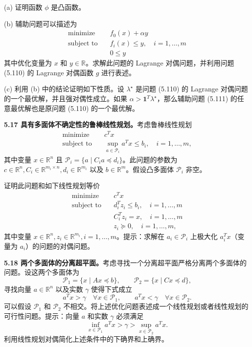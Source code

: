 \documentclass[UTF8,12pt,a4paper,fontset=fandol]{ctexart}
\begin{document}
(a) 证明函数 $\phi$ 是凸函数。

(b) 辅助问题可以描述为
\[
\begin{aligned}
\text{minimize}\quad & f_0(x)+\alpha y\\
\text{subject to}\quad & f_i(x)\leq y,\quad i=1,\ldots,m\\
& 0\leq y
\end{aligned}
\]
其中优化变量为 $x$ 和 $y\in\mathbb{R}$。求解此问题的 Lagrange 对偶问题，并利用问题 (5.110) 的 Lagrange 对偶函数 $g$ 进行表述。

(c) 利用 (b) 中的结论证明如下性质。设 $\lambda^\star$ 是问题 (5.110) 的 Lagrange 对偶问题的一个最优解，并且强对偶性成立。如果 $\alpha>\mathbf{1}^T\lambda^\star$，那么辅助问题 (5.111) 的任意最优解也是原问题 (5.110) 的一个最优解。

\noindent\textbf{5.17 具有多面体不确定性的鲁棒线性规划。}\quad 考虑鲁棒线性规划
\[
\begin{aligned}
\text{minimize}\quad & c^Tx\\
\text{subject to}\quad & \sup_{a\in\mathcal{P}_i}a^Tx\leq b_i,\quad i=1,\ldots,m,
\end{aligned}
\]
其中变量 $x\in\mathbb{R}^n$ 且 $\mathcal{P}_i=\{a\mid C_ia\preceq d_i\}$。此问题的参数为 $c\in\mathbb{R}^n, C_i\in\mathbb{R}^{m_i\times n}, d_i\in\mathbb{R}^{m_i}$ 以及 $b\in\mathbb{R}^m$。假设凸多面体 $\mathcal{P}_i$ 非空。

证明此问题和如下线性规划等价
\[
\begin{aligned}
\text{minimize}\quad & c^Tx\\
\text{subject to}\quad & d_i^Tz_i\leq b_i,\quad i=1,\ldots,m\\
& C_i^Tz_i=x,\quad i=1,\ldots,m\\
& z_i\succeq 0,\quad i=1,\ldots,m,
\end{aligned}
\]
其中变量 $x\in\mathbb{R}^n, z_i\in\mathbb{R}^{m_i}, i=1,\ldots,m$。提示：求解在 $a_i\in\mathcal{P}_i$ 上极大化 $a_i^Tx$（变量为 $a_i$）的问题的对偶问题。

\noindent\textbf{5.18 两个多面体的分离超平面。}\quad 考虑寻找一个分离超平面严格分离两个多面体的问题。设这两个多面体为
\[
\mathcal{P}_1=\{x\mid Ax\preceq b\},\qquad \mathcal{P}_2=\{x\mid Cx\preceq d\},
\]
寻找向量 $a\in\mathbb{R}^n$ 以及实数 $\gamma$ 使得下式成立
\[
a^Tx>\gamma\quad \forall x\in\mathcal{P}_1,\qquad a^Tx<\gamma\quad \forall x\in\mathcal{P}_2.
\]
可以假设 $\mathcal{P}_1$ 和 $\mathcal{P}_2$ 不相交。将上述优化问题表述成一个线性规划或者线性规划的可行性问题。提示：向量 $a$ 和实数 $\gamma$ 必须满足
\[
\inf_{x\in\mathcal{P}_1}a^Tx>\gamma>\sup_{x\in\mathcal{P}_2}a^Tx.
\]
利用线性规划对偶简化上述条件中的下确界和上确界。
\end{document}
